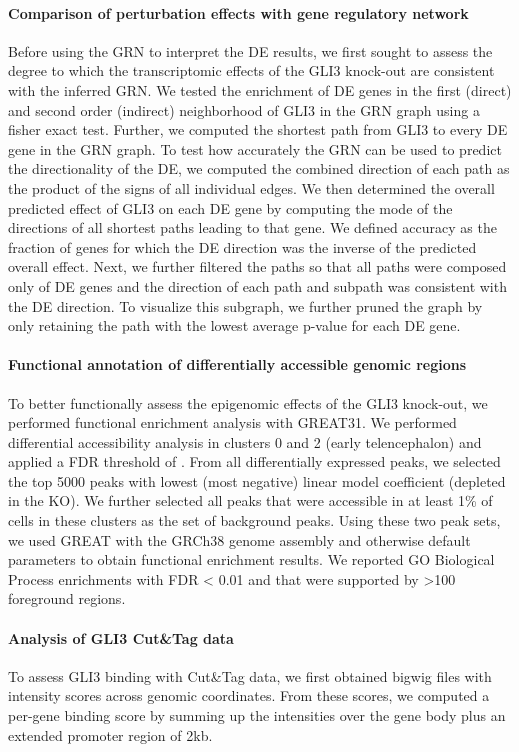 \paragraph{Comparison of perturbation effects with gene regulatory network}
Before using the GRN to interpret the DE results, we first sought to assess the degree to which the transcriptomic effects of the GLI3 knock-out are consistent with the inferred GRN. We tested the enrichment of DE genes in the first (direct) and second order (indirect) neighborhood of GLI3 in the GRN graph using a fisher exact test. Further, we computed the shortest path from GLI3 to every DE gene in the GRN graph. To test how accurately the GRN can be used to predict the directionality of the DE, we computed the combined direction of each path as the product of the signs of all individual edges. We then determined the overall predicted effect of GLI3 on each DE gene by computing the mode of the directions of all shortest paths leading to that gene. We defined accuracy as the fraction of genes for which the DE direction was the inverse of the predicted overall effect. Next, we further filtered the paths so that all paths were composed only of DE genes and the direction of each path and subpath was consistent with the DE direction. To visualize this subgraph, we further pruned the graph by only retaining the path with the lowest average  p-value for each DE gene.
 
\paragraph{Functional annotation of differentially accessible genomic regions}
To better functionally assess the epigenomic effects of the GLI3 knock-out, we performed functional enrichment analysis with GREAT31. We performed differential accessibility analysis in clusters 0 and 2 (early telencephalon) and applied a FDR threshold of . From all differentially expressed peaks, we selected the top 5000 peaks with lowest (most negative) linear model coefficient (depleted in the KO). We further selected all peaks that were accessible in at least 1\% of cells in these clusters as the set of background peaks. Using these two peak sets, we used GREAT with the GRCh38 genome assembly and otherwise default parameters to obtain functional enrichment results. We reported GO Biological Process enrichments with FDR < 0.01 and that were supported by >100 foreground regions.
 
\paragraph{Analysis of GLI3 Cut\&Tag data}
To assess GLI3 binding with Cut\&Tag data, we first obtained bigwig files with intensity scores across genomic coordinates. From these scores, we computed a per-gene binding score by summing up the intensities over the gene body plus an extended promoter region of 2kb.
 
